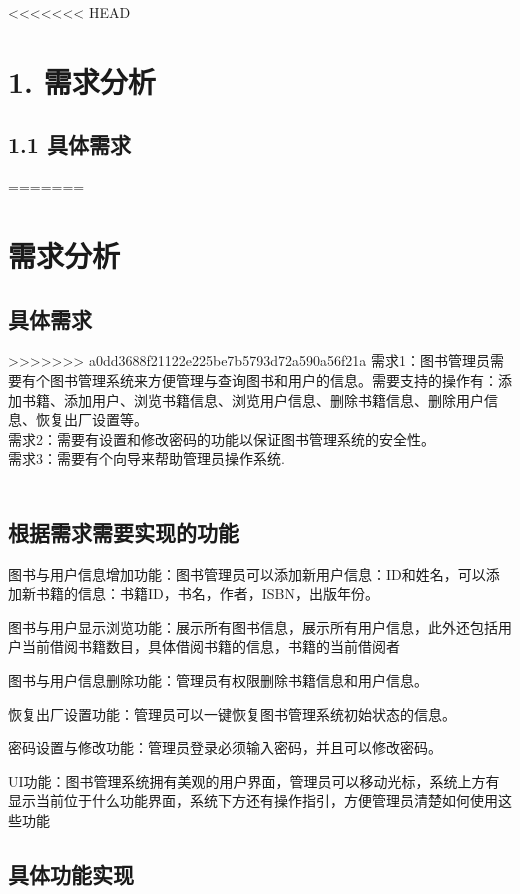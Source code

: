 \documentclass{article}
\begin{document}
<<<<<<< HEAD
\section*{1. 需求分析}
\subsection*{1.1 具体需求}
=======
\section{需求分析}

\subsection{具体需求}
>>>>>>> a0dd3688f21122e225be7b5793d72a590a56f21a
\noindent
需求1：图书管理员需要有个图书管理系统来方便管理与查询图书和用户的信息。需要支持的操作有：添加书籍、添加用户、浏览书籍信息、浏览用户信息、删除书籍信息、删除用户信息、恢复出厂设置等。\\
需求2：需要有设置和修改密码的功能以保证图书管理系统的安全性。\\
需求3：需要有个向导来帮助管理员操作系统.\\\\

\subsection{根据需求需要实现的功能}
图书与用户信息增加功能：图书管理员可以添加新用户信息：ID和姓名，可以添加新书籍的信息：书籍ID，书名，作者，ISBN，出版年份。

图书与用户显示浏览功能：展示所有图书信息，展示所有用户信息，此外还包括用户当前借阅书籍数目，具体借阅书籍的信息，书籍的当前借阅者

图书与用户信息删除功能：管理员有权限删除书籍信息和用户信息。

恢复出厂设置功能：管理员可以一键恢复图书管理系统初始状态的信息。

密码设置与修改功能：管理员登录必须输入密码，并且可以修改密码。

UI功能：图书管理系统拥有美观的用户界面，管理员可以移动光标，系统上方有显示当前位于什么功能界面，系统下方还有操作指引，方便管理员清楚如何使用这些功能\\
\subsection{具体功能实现}
\end{document}
